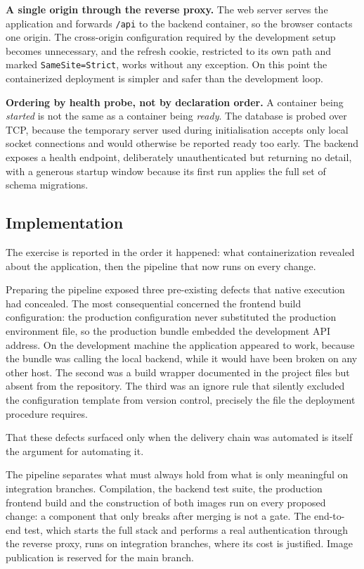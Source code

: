 \textbf{A single origin through the reverse proxy.} The web server serves the application and
forwards \texttt{/api} to the backend container, so the browser contacts one origin. The
cross-origin configuration required by the development setup becomes unnecessary, and the refresh
cookie, restricted to its own path and marked \texttt{SameSite=Strict}, works without any exception.
On this point the containerized deployment is simpler and safer than the development loop.

\textbf{Ordering by health probe, not by declaration order.} A container being \emph{started} is not
the same as a container being \emph{ready}. The database is probed over TCP, because the temporary
server used during initialisation accepts only local socket connections and would otherwise be
reported ready too early. The backend exposes a health endpoint, deliberately unauthenticated but
returning no detail, with a generous startup window because its first run applies the full set of
schema migrations.

\subsection{Implementation}
The exercise is reported in the order it happened: what containerization revealed about the
application, then the pipeline that now runs on every change.


Preparing the pipeline exposed three pre-existing defects that native execution had concealed. The
most consequential concerned the frontend build configuration: the production configuration never
substituted the production environment file, so the production bundle embedded the development API
address. On the development machine the application appeared to work, because the bundle was calling
the local backend, while it would have been broken on any other host. The second was a build wrapper
documented in the project files but absent from the repository. The third was an ignore rule that
silently excluded the configuration template from version control, precisely the file the deployment
procedure requires.

That these defects surfaced only when the delivery chain was automated is itself the argument for
automating it.

The pipeline separates what must always hold from what is only meaningful on integration branches.
Compilation, the backend test suite, the production frontend build and the construction of both
images run on every proposed change: a component that only breaks after merging is not a gate. The
end-to-end test, which starts the full stack and performs a real authentication through the reverse
proxy, runs on integration branches, where its cost is justified. Image publication is reserved for
the main branch.

